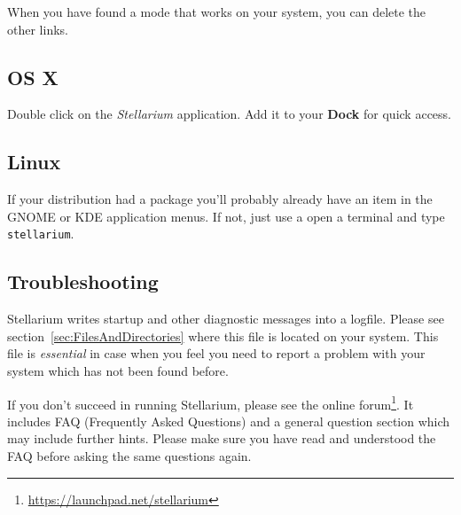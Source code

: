   When you have found a mode that works on your system, you can delete
  the other links.

\subsection{OS X}
\label{sec:GettingStarted:Running:MacOSX}

Double click on the \emph{Stellarium} application.  Add it to your
\textbf{Dock} for quick access.

\subsection{Linux}
\label{sec:GettingStarted:Running:Linux}

If your distribution had a package you'll probably already have an
item in the GNOME or KDE application menus. If not, just use a open a
terminal and type \texttt{stellarium}.


\subsection{Troubleshooting}
\label{sec:GettingStarted:Running:Troubleshooting}

Stellarium writes startup and other diagnostic messages into a
logfile. Please see section~\ref{sec:FilesAndDirectories} where this
file is located on your system. This file is \emph{essential} in case when
you feel you need to report a problem with your system which has not
been found before.

If you don't succeed in running Stellarium, please see the online
forum\footnote{\url{https://launchpad.net/stellarium}}.  It includes
FAQ (Frequently Asked Questions) and a general question
section which may include further hints. Please make sure you have
read and understood the FAQ before asking the same questions again.


